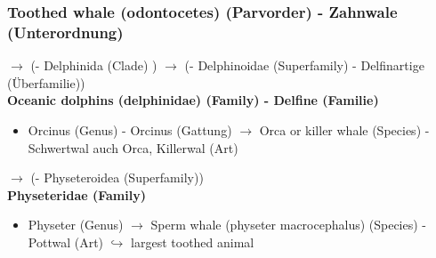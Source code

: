 \documentclass[12pt,a4paper]{article}
\begin{document}
\subsubsection{Toothed whale (odontocetes) (Parvorder) - Zahnwale (Unterordnung)} %
\label{ssub:toothed_whale_odontocetes_parvorder_zahnwale_unterordnung_}
\indent $\longrightarrow$ (- Delphinida (Clade) )
\newline \indent $\longrightarrow$ (- Delphinoidae (Superfamily) - Delfinartige (Überfamilie)) \\
\textbf{Oceanic dolphins (delphinidae) (Family) - Delfine (Familie)}
\begin{itemize}
  \item Orcinus (Genus) - Orcinus (Gattung)
    \newline \indent $\longrightarrow$ Orca or killer whale (Species) - Schwertwal auch Orca, Killerwal (Art)
\end{itemize}

\indent $\longrightarrow$ (- Physeteroidea (Superfamily)) \\
\textbf{Physeteridae (Family)}
\begin{itemize}
  \item Physeter (Genus)
    \newline \indent $\longrightarrow$ Sperm whale (physeter macrocephalus) (Species) - Pottwal (Art)
    \newline \indent $\hookrightarrow$ largest toothed animal 
\end{itemize}







% 
\noindent\hrulefill
\end{document}
